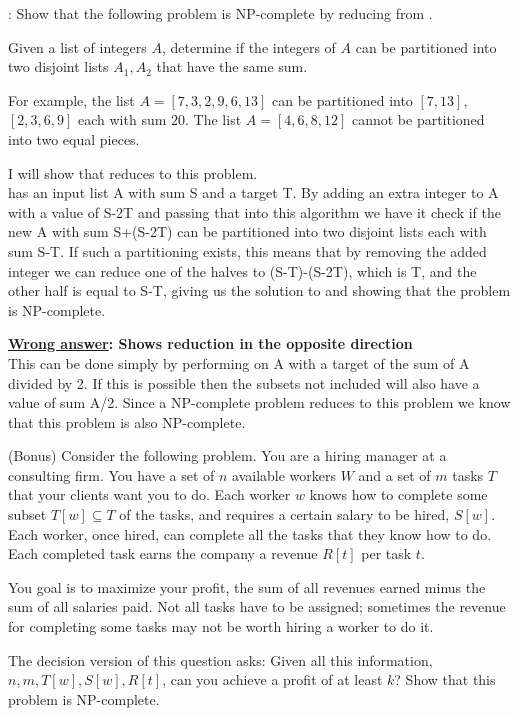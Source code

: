 \begin{questions}
\begin{solution}
  \end{solution}

  
  \question[20] :
  Show that the following problem is NP-complete by reducing from \SSM.

  Given a list of integers $A$, determine if the integers of $A$ can be
  partitioned into two disjoint lists $A_1, A_2$ that have the same sum.

  For example, the list $A = [7, 3, 2, 9, 6, 13]$ can be partitioned into
  $[7,13]$, $[2,3,6,9]$ each with sum $20$. The list $A = [4,6,8,12]$ cannot be
  partitioned into two equal pieces.
  \begin{solution}
    I will show that \SSM reduces to this problem.\\
    \SSM has an input list A with sum S and a target T. 
    By adding an extra integer to A with a value of S-2T and passing that into
    this algorithm we have it check if the new A with sum S+(S-2T) can be
    partitioned into two disjoint lists each with sum S-T. If such a
    partitioning exists, this means that by removing the added integer we can
    reduce one of the halves to (S-T)-(S-2T), which is T, and the other half is
    equal to S-T, giving us the solution to \SSM and showing that the problem is
    NP-complete. 


    \textbf{\underline{Wrong answer}: Shows reduction in the opposite direction}\\
    This can be done simply by performing \SSM on A with a target of the sum of
    A divided by 2. If this is possible then the subsets not included will also
    have a value of sum A/2. Since a NP-complete problem reduces to this problem
    we know that this problem is also NP-complete. 
  \end{solution}

  \question (Bonus) Consider the following problem.
  You are a hiring manager at a consulting firm.
  You have a set of $n$ available workers $W$ and a set of $m$ tasks $T$ that
  your clients want you to do.
  Each worker $w$ knows how to complete some subset $T[w] \subseteq T$ of the
  tasks, and requires a certain salary to be hired, $S[w]$.
  Each worker, once hired, can complete all the tasks that they know
  how to do. Each completed task earns the company a revenue $R[t]$ per task
  $t$.

  You goal is to maximize your profit, the sum of all revenues earned minus
  the sum of all salaries paid.  Not all tasks have to be assigned; sometimes
  the revenue for completing some tasks may not be worth hiring a worker to do
  it. 

  The decision version of this question asks: Given all this information, $n,
  m, T[w], S[w], R[t]$, can you achieve a profit of at least $k$?  Show that
  this problem is NP-complete.
  \begin{solution}
  \end{solution}
\end{questions}



